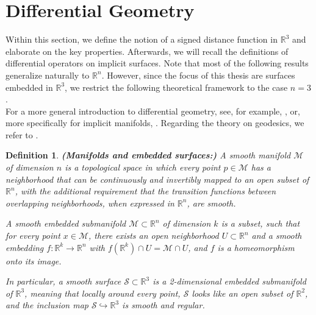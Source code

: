 \documentclass[12pt,openany]{book}
\newcommand{\R}{\mathbb{R}}
\theoremstyle{plainnormal}
\newtheorem{definition}[theorem]{Definition}
\theoremstyle{remark}
\begin{document}
\section{Differential Geometry}
Within this section, we define the notion of a signed distance function in $\R^3$ and elaborate on the key properties. Afterwards, we will recall the definitions of differential operators on implicit surfaces. Note that most of the following results generalize naturally to $\R^n$. However, since the focus of this thesis are surfaces embedded in $\R^3$, we restrict the following theoretical framework to the case $n=3$.\\
For a more general introduction to differential geometry, see, for example, \cite{Lee00}, or, more specifically for implicit manifolds, \cite{Dziuk_Elliott_2013}. Regarding the theory on geodesics, we refer to \cite{Dacorogna}.
\begin{definition}\textbf{(Manifolds and embedded surfaces:)}
A \emph{smooth manifold} \(\mathcal{M}\) of dimension \(n\) is a topological space in which every point \(p \in \mathcal{M}\) has a neighborhood that can be continuously and invertibly mapped to an open subset of \(\mathbb{R}^n\), with the additional requirement that the transition functions between overlapping neighborhoods, when expressed in \(\mathbb{R}^n\), are smooth.\par
A \emph{smooth embedded submanifold} \(\mathcal{M} \subset \mathbb{R}^n\) of dimension \(k\) is a subset, such that for every point \(x \in \mathcal{M}\), there exists an open neighborhood \(U \subset \mathbb{R}^n\) and a smooth embedding \(f: \mathbb{R}^k \to \mathbb{R}^n\) with \(f(\mathbb{R}^k) \cap U = \mathcal{M} \cap U\), and \(f\) is a homeomorphism onto its image.\par
In particular, a \emph{smooth surface} \(\mathcal{S} \subset \mathbb{R}^3\) is a 2-dimensional embedded submanifold of \(\mathbb{R}^3\), meaning that locally around every point, \(\mathcal{S}\) looks like an open subset of \(\mathbb{R}^2\), and the inclusion map \(\mathcal{S} \hookrightarrow \mathbb{R}^3\) is smooth and regular.
\end{definition}
\end{document}
